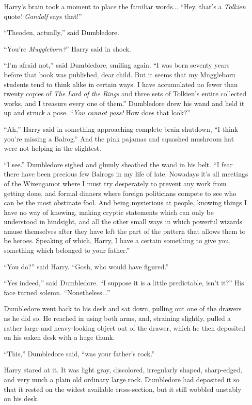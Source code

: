 Harry’s brain took a moment to place the familiar words... “Hey, that’s a \emph{Tolkien} quote! \emph{Gandalf} says that!”

“Theoden, actually,” said Dumbledore.

“You’re \emph{Muggleborn?}” Harry said in shock.

“I’m afraid not,” said Dumbledore, smiling again. “I was born seventy years before that book was published, dear child. But it seems that my Muggleborn students tend to think alike in certain ways. I have accumulated no fewer than twenty copies of \emph{The Lord of the Rings} and three sets of Tolkien’s entire collected works, and I treasure every one of them.” Dumbledore drew his wand and held it up and struck a pose. “\emph{You cannot pass!} How does that look?”

“Ah,” Harry said in something approaching complete brain shutdown, “I think you’re missing a Balrog.” And the pink pajamas and squashed mushroom hat were not helping in the slightest.

“I see.” Dumbledore sighed and glumly sheathed the wand in his belt. “I fear there have been precious few Balrogs in my life of late. Nowadays it’s all meetings of the Wizengamot where I must try desperately to prevent any work from getting done, and formal dinners where foreign politicians compete to see who can be the most obstinate fool. And being mysterious at people, knowing things I have no way of knowing, making cryptic statements which can only be understood in hindsight, and all the other small ways in which powerful wizards amuse themselves after they have left the part of the pattern that allows them to be heroes. Speaking of which, Harry, I have a certain something to give you, something which belonged to your father.”

“You do?” said Harry. “Gosh, who would have figured.”

“Yes indeed,” said Dumbledore. “I suppose it is a little predictable, isn’t it?” His face turned solemn. “Nonetheless...”

Dumbledore went back to his desk and sat down, pulling out one of the drawers as he did so. He reached in using both arms, and, straining slightly, pulled a rather large and heavy-looking object out of the drawer, which he then deposited on his oaken desk with a huge thunk.

“This,” Dumbledore said, “was your father’s rock.”

Harry stared at it. It was light gray, discolored, irregularly shaped, sharp-edged, and very much a plain old ordinary large rock. Dumbledore had deposited it so that it rested on the widest available cross-section, but it still wobbled unstably on his desk.

